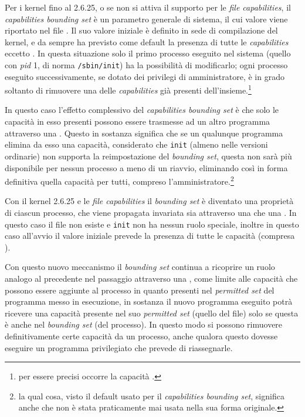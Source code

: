 Per i kernel fino al 2.6.25, o se non si attiva il supporto per le
\textit{file capabilities}, il \textit{capabilities bounding set} è un
parametro generale di sistema, il cui valore viene riportato nel file
. Il suo valore iniziale è definito in sede di
compilazione del kernel, e da sempre ha previsto come default la presenza di
tutte le \textit{capabilities} eccetto . In questa
situazione solo il primo processo eseguito nel sistema (quello con
\textsl{pid} 1, di norma \texttt{/sbin/init}) ha la possibilità di
modificarlo; ogni processo eseguito successivamente, se dotato dei privilegi
di amministratore, è in grado soltanto di rimuovere una delle
\textit{capabilities} già presenti dell'insieme.\footnote{per essere precisi
  occorre la capacità .}

In questo caso l'effetto complessivo del \textit{capabilities bounding set} è
che solo le capacità in esso presenti possono essere trasmesse ad un altro
programma attraverso una . Questo in sostanza significa che se un
qualunque programma elimina da esso una capacità, considerato che
\texttt{init} (almeno nelle versioni ordinarie) non supporta la reimpostazione
del \textit{bounding set}, questa non sarà più disponibile per nessun processo
a meno di un riavvio, eliminando così in forma definitiva quella capacità per
tutti, compreso l'amministratore.\footnote{la qual cosa, visto il default
  usato per il \textit{capabilities bounding set}, significa anche che
   non è stata praticamente mai usata nella sua forma
  originale.}

Con il kernel 2.6.25 e le \textit{file capabilities} il \textit{bounding set}
è diventato una proprietà di ciascun processo, che viene propagata invariata
sia attraverso una  che una . In questo caso il file
 non esiste e \texttt{init} non ha nessun
ruolo speciale, inoltre in questo caso all'avvio il valore iniziale prevede la
presenza di tutte le capacità (compresa ). 

Con questo nuovo meccanismo il \textit{bounding set} continua a ricoprire un
ruolo analogo al precedente nel passaggio attraverso una , come
limite alle capacità che possono essere aggiunte al processo in quanto
presenti nel \textit{permitted set} del programma messo in esecuzione, in
sostanza il nuovo programma eseguito potrà ricevere una capacità presente nel
suo \textit{permitted set} (quello del file) solo se questa è anche nel
\textit{bounding set} (del processo). In questo modo si possono rimuovere
definitivamente certe capacità da un processo, anche qualora questo dovesse
eseguire un programma privilegiato che prevede di riassegnarle.

